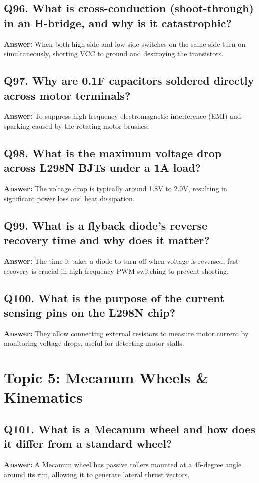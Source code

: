 \documentclass[12pt,a4paper,oneside]{report}
\begin{document}
\section{Q96. What is cross-conduction (shoot-through) in an H-bridge, and why is it catastrophic?}
\textbf{Answer:} When both high-side and low-side switches on the same side turn on simultaneously, shorting VCC to ground and destroying the transistors.

\section{Q97. Why are 0.1\textmu{}F capacitors soldered directly across motor terminals?}
\textbf{Answer:} To suppress high-frequency electromagnetic interference (EMI) and sparking caused by the rotating motor brushes.

\section{Q98. What is the maximum voltage drop across L298N BJTs under a 1A load?}
\textbf{Answer:} The voltage drop is typically around 1.8V to 2.0V, resulting in significant power loss and heat dissipation.

\section{Q99. What is a flyback diode's reverse recovery time and why does it matter?}
\textbf{Answer:} The time it takes a diode to turn off when voltage is reversed; fast recovery is crucial in high-frequency PWM switching to prevent shorting.

\section{Q100. What is the purpose of the current sensing pins on the L298N chip?}
\textbf{Answer:} They allow connecting external resistors to measure motor current by monitoring voltage drops, useful for detecting motor stalls.

\chapter{Topic 5: Mecanum Wheels \& Kinematics}

\section{Q101. What is a Mecanum wheel and how does it differ from a standard wheel?}
\textbf{Answer:} A Mecanum wheel has passive rollers mounted at a 45-degree angle around its rim, allowing it to generate lateral thrust vectors.
\end{document}
